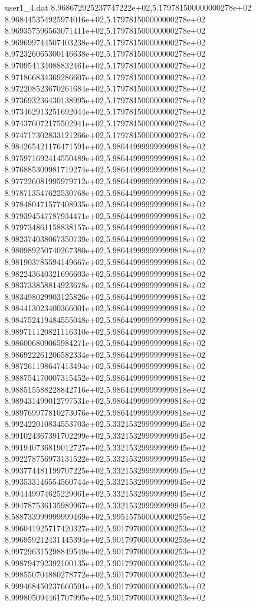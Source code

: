 \begin{filecontents}{user1_4.dat}
8.968672925237747222e+02,5.179781500000000278e+02
8.968445354925974016e+02,5.179781500000000278e+02
8.969357596563071411e+02,5.179781500000000278e+02
8.969699744507403238e+02,5.179781500000000278e+02
8.972326065300146638e+02,5.179781500000000278e+02
8.970954134088832461e+02,5.179781500000000278e+02
8.971866834369286607e+02,5.179781500000000278e+02
8.972208523670261684e+02,5.179781500000000278e+02
8.973693236430138995e+02,5.179781500000000278e+02
8.973462913251692044e+02,5.179781500000000278e+02
8.974376072175502941e+02,5.179781500000000278e+02
8.974717302833121266e+02,5.179781500000000278e+02
8.984265421176471591e+02,5.986449999999999818e+02
8.975971692414550489e+02,5.986449999999999818e+02
8.976885309981719274e+02,5.986449999999999818e+02
8.977226081995979712e+02,5.986449999999999818e+02
8.978713547622530768e+02,5.986449999999999818e+02
8.978480471577408935e+02,5.986449999999999818e+02
8.979394547787934471e+02,5.986449999999999818e+02
8.979734861158838157e+02,5.986449999999999818e+02
8.982374038067350739e+02,5.986449999999999818e+02
8.980989250740267380e+02,5.986449999999999818e+02
8.981903785594149667e+02,5.986449999999999818e+02
8.982243640321696603e+02,5.986449999999999818e+02
8.983733858814923678e+02,5.986449999999999818e+02
8.983498029903125826e+02,5.986449999999999818e+02
8.984413023400366001e+02,5.986449999999999818e+02
8.984752419484555048e+02,5.986449999999999818e+02
8.989711120821116310e+02,5.986449999999999818e+02
8.986006809065984271e+02,5.986449999999999818e+02
8.986922261206582334e+02,5.986449999999999818e+02
8.987261198647413494e+02,5.986449999999999818e+02
8.988754170007315452e+02,5.986449999999999818e+02
8.988515588228842716e+02,5.986449999999999818e+02
8.989431499012797531e+02,5.986449999999999818e+02
8.989769977810273076e+02,5.986449999999999818e+02
8.992422010834553703e+02,5.332153299999999945e+02
8.991024367391702299e+02,5.332153299999999945e+02
8.991940736819012727e+02,5.332153299999999945e+02
8.992278756973131522e+02,5.332153299999999945e+02
8.993774481199707225e+02,5.332153299999999945e+02
8.993533146554560744e+02,5.332153299999999945e+02
8.994449974625229061e+02,5.332153299999999945e+02
8.994787536135989967e+02,5.332153299999999945e+02
8.588733999999999469e+02,5.995157500000000255e+02
8.996041925717420327e+02,5.901797000000000253e+02
8.996959212431445394e+02,5.901797000000000253e+02
8.997296315298849549e+02,5.901797000000000253e+02
8.998794792392100135e+02,5.901797000000000253e+02
8.998550704880278772e+02,5.901797000000000253e+02
8.999468450237660591e+02,5.901797000000000253e+02
8.999805094461707995e+02,5.901797000000000253e+02

\end{filecontents}

